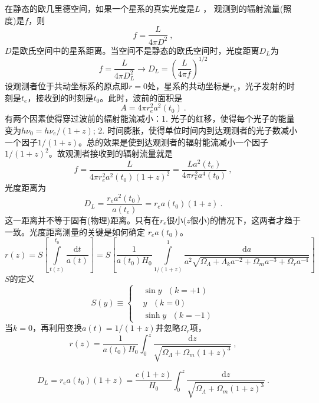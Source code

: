\documentclass[12pt,a4paper]{article}
\newcommand{\dif}{\mathrm{d}}
\begin{document}
在静态的欧几里德空间，如果一个星系的真实光度是$L$ ， 观测到的辐射流量(照度)是$f$，则
\begin{equation}
f =\dfrac{L}{4\pi D^2} ~,
\end{equation}
$D$是欧氏空间中的星系距离。当空间不是静态的欧氏空间时，光度距离$D_L$为
\begin{equation*}
f =\dfrac{L}{4\pi D_L^2} \rightarrow D_L = \left(\dfrac{L}{4\pi f} \right)^{1/2}
\end{equation*}
设观测者位于共动坐标系的原点即$r=0$处，星系的共动坐标是$r_e$，光子发射的时刻是$t_e$，接收到的时刻是$t_0$。此时，波前的面积是
\begin{equation}
A = 4\pi r_e^2 a^2(t_0) ~.
\end{equation}
有两个因素使得穿过波前的辐射能流减小：1. 光子的红移，使得每个光子的能量变为$h \nu_0 = h \nu_e/(1+z)$; 2. 时间膨胀，使得单位时间内到达观测者的光子数减小一个因子$1/(1+z)$。总的效果是使到达观测者的辐射能流减小一个因子$1/(1+z)^2$。故观测者接收到的辐射流量就是
\begin{equation}
f = \dfrac{L}{4\pi r_e^2 a^2(t_0) (1+z)^2} = \dfrac{L a^2(t_e)}{4\pi r_e^2 a^4(t_0)} ~,
\end{equation}
光度距离为
\begin{equation}
D_L = \dfrac{r_e a^2(t_0)}{a(t_e)} = r_e a(t_0) (1+z) ~.
\end{equation}
这一距离并不等于固有(物理)距离。只有在$r_e$很小($z$很小)的情况下，这两者才趋于一致。光度距离测量的关键是如何确定 $r_e a(t_0)$。
\begin{equation}
r(z) = S\left[\int\limits_{t(z)}^{t_0} \dfrac{\dif t}{a(t)} \right] = S\left[\dfrac{1}{a(t_0) H_0} \int\limits_{1/(1+z)}^{1} \dfrac{\dif a}{a^2 \sqrt{\Omega_\Lambda +\Lambda_k a^{-2} +\Omega_m a^{-3} +\Omega_r a^{-4} } } \right]
\end{equation}
$S$的定义
\begin{equation}
S(y) \equiv \left\{
\begin{aligned}
& \sin y ~~~ (k = +1) \\
& y ~~~ (k = 0) \\
& \sinh y ~~~ (k = -1)
\end{aligned}
\right.
\end{equation}
当$k=0$，再利用变换$a(t) =1/(1+z)$井忽略$\Omega_{r}$项，
\begin{equation}
r(z) = \dfrac{1}{a(t_0) H_0} \int_0^z  \dfrac{\dif z}{\sqrt{\Omega_\Lambda  +\Omega_m (1+z)^{3} } } ~,
\end{equation}

\begin{equation}
D_L = r_e a(t_0) (1+z) = \dfrac{c(1+z)}{H_0} \int_0^z \dfrac{\dif z}{\sqrt{\Omega_\Lambda  +\Omega_m (1+z)^{3} } } ~.
\end{equation}
\end{document}
